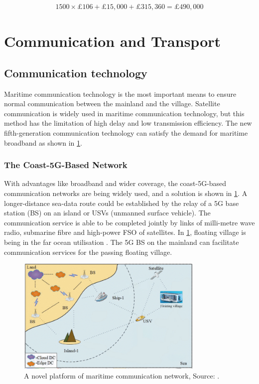 \documentclass[11pt]{article}
\numberwithin{equation}{section}
\begin{document}
\begin{align}
\label{eqSomeCalc}
1500\times\pounds106 + \pounds15,000 + \pounds315,360 = \pounds 490,000
\end{align}

\section{Communication and Transport}
\label{sec:org78f8834}
\subsection{Communication technology}
\label{sec:orga400ac4}
Maritime communication technology is the most important means to ensure normal communication between the mainland and the village.  Satellite communication is widely used in maritime communication technology, but this method has the limitation of high delay and low transmission efficiency. The new fifth-generation communication technology can satisfy the demand for maritime broadband as shown in \ref{A_novel_platform_of_maritime_communication_network}.

\subsubsection{The Coast-5G-Based Network}
\label{sec:org497e902}
With advantages like broadband and wider coverage, the coast-5G-based communication networks are being widely used, and a solution is shown in \ref{A_novel_platform_of_maritime_communication_network}. A longer-distance sea-data route could be established by the relay of a 5G base station (BS) on an island or USVs (unmanned surface vehicle). The communication service is able to be completed jointly by links of milli-metre wave radio, submarine fibre and high-power FSO of satellites.  In \ref{A_novel_platform_of_maritime_communication_network}, floating village is being in the far ocean utilisation \cite{10.1109/ISPA-BDCloud-SocialCom-SustainCom51426.2020.00190}. The 5G BS on the mainland can facilitate communication services for the passing floating village.

\begin{figure}[H]
\centering
\includegraphics[width=0.8\textwidth]{Figures/A_novel_platform_of_maritime_communication_network.jpg}
\caption{\label{A_novel_platform_of_maritime_communication_network}A novel platform of maritime communication network, Source: \cite{10.1109/ISPA-BDCloud-SocialCom-SustainCom51426.2020.00190}.}
\end{figure}
\end{document}
